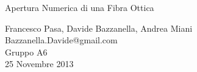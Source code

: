 \begin{center}

     	{\huge Apertura Numerica di una Fibra Ottica}
	\vspace{0.3cm}

      	{\large Francesco Pasa, Davide Bazzanella, Andrea Miani} \\
      	{Bazzanella.Davide@gmail.com} \\
		{\large Gruppo A6} \\
	
	\vspace{0.3cm}
      	{\large 25 Novembre 2013}

\end{center}
